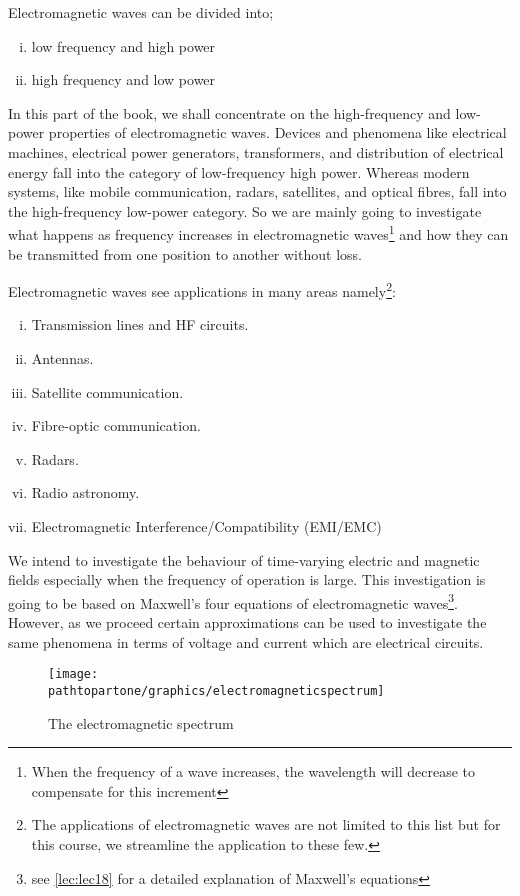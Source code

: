 Electromagnetic waves can be divided into;
\begin{enumerate}[(i)]
\item low frequency and high power
\item high frequency and low power
\end{enumerate}

In this part of the book, we shall concentrate on the high-frequency and low-power properties of electromagnetic waves. Devices and phenomena like electrical machines, electrical power generators, transformers, and distribution of electrical energy fall into the category of low-frequency high power. Whereas modern systems, like mobile communication, radars, satellites, and optical fibres, fall into the high-frequency low-power category. So we are mainly going to investigate what happens as frequency increases in electromagnetic waves\footnote{
When the frequency of a wave increases, the wavelength will decrease to compensate for this increment
} and how they can be transmitted from one position to another without loss.

Electromagnetic waves see applications in many areas namely\footnote{
The applications of electromagnetic waves are not limited to this list but for this course, we streamline the application to these few.
}:
\begin{enumerate}[(i)]
\item Transmission lines and HF circuits.
\item Antennas.
\item Satellite communication.
\item Fibre-optic communication.
\item Radars.
\item Radio astronomy.
\item Electromagnetic Interference/Compatibility (EMI/EMC)
\end{enumerate}

We intend to investigate the behaviour of time-varying electric and magnetic fields especially when the frequency of operation is large. This investigation is going to be based on Maxwell's four equations of electromagnetic waves\footnote{
see \autoref{lec:lec18} for a detailed explanation of Maxwell's equations
}. However, as we proceed certain approximations can be used to investigate the same phenomena in terms of voltage and current which are electrical circuits.
\begin{figure}[h]
\centering
\texttt{[image: \\pathtopartone/graphics/electromagneticspectrum]}
\caption{The electromagnetic spectrum}
\label{fig:electromagneticspectrum}
\end{figure}

